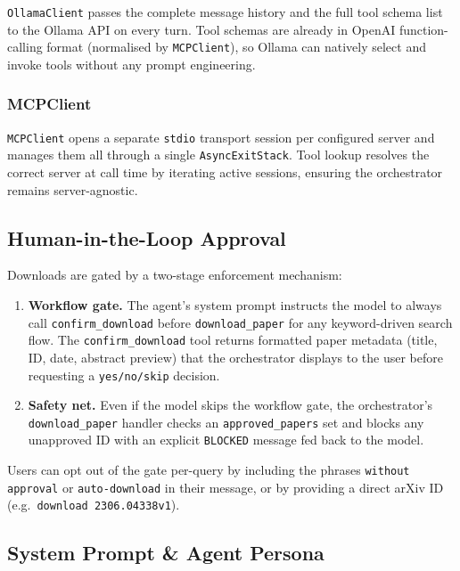 \documentclass[12pt, a4paper]{article}
\newcommand{\code}[1]{\texttt{\small\color{darwinblue}#1}}
\begin{document}
\code{OllamaClient} passes the complete message history and the full tool schema list to the Ollama API on every turn. Tool schemas are already in OpenAI function-calling format (normalised by \code{MCPClient}), so Ollama can natively select and invoke tools without any prompt engineering.

\subsubsection{MCPClient}

\code{MCPClient} opens a separate \code{stdio} transport session per configured server and manages them all through a single \code{AsyncExitStack}. Tool lookup resolves the correct server at call time by iterating active sessions, ensuring the orchestrator remains server-agnostic.

\subsection{Human-in-the-Loop Approval}

Downloads are gated by a two-stage enforcement mechanism:

\begin{enumerate}[leftmargin=2em, itemsep=4pt]
    \item \textbf{Workflow gate.} The agent's system prompt instructs the model to always call \code{confirm\_download} before \code{download\_paper} for any keyword-driven search flow. The \code{confirm\_download} tool returns formatted paper metadata (title, ID, date, abstract preview) that the orchestrator displays to the user before requesting a \texttt{yes/no/skip} decision.
    \item \textbf{Safety net.} Even if the model skips the workflow gate, the orchestrator's \code{download\_paper} handler checks an \code{approved\_papers} set and blocks any unapproved ID with an explicit \texttt{BLOCKED} message fed back to the model.
\end{enumerate}

Users can opt out of the gate per-query by including the phrases \texttt{without approval} or \texttt{auto-download} in their message, or by providing a direct arXiv ID (e.g.\ \texttt{download 2306.04338v1}).

\subsection{System Prompt \& Agent Persona}
\end{document}
